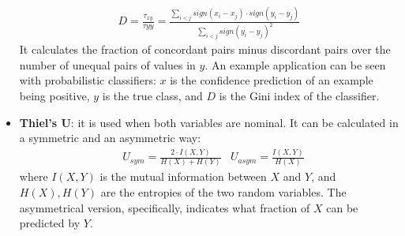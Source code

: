 \begin{itemize}
    \begin{eqnarray}
        D = \frac{\tau_{xy}}{\tau{yy}} = \frac{\sum_{i<j} \textit{sign}(x_i - x_j) \cdot \textit{sign}(y_i - y_j)}{\sum_{i<j} \textit{sign}(y_i - y_j)^2}
    \end{eqnarray}
    It calculates the fraction of concordant pairs minus discordant pairs over the number of unequal pairs of values in $y$. An example application can be seen with probabilistic classifiers: $x$ is the confidence prediction of an example being positive, $y$ is the true class, and $D$ is the Gini index of the classifier.
    \item \textbf{Thiel's U}: it is used when both variables are nominal. It can be calculated in a symmetric and an asymmetric way:
    \begin{align*}
        &U_{sym} = \frac{2 \cdot I(X,Y)}{H(X) + H(Y)} &U_{asym} = \frac{I(X,Y)}{H(X)}
    \end{align*}
    where $I(X,Y)$ is the mutual information between $X$ and $Y$, and $H(X), H(Y)$ are the entropies of the two random variables. The asymmetrical version, specifically, indicates what fraction of $X$ can be predicted by $Y$.
\end{itemize}
